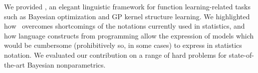 We provided \gpmem, an elegant linguistic framework for function learning-related tasks such as Bayesian optimization and \ac{GP} kernel structure learning.
We highlighted how \gpmem\ overcomes shortcomings of the notations currently used
in statistics, and how language constructs from programming allow the expression
of models which would be cumbersome (prohibitively so, in some cases) to express
in statistics notation. We evaluated our contribution on a range of hard problems for state-of-the-art Bayesian nonparametrics. 

